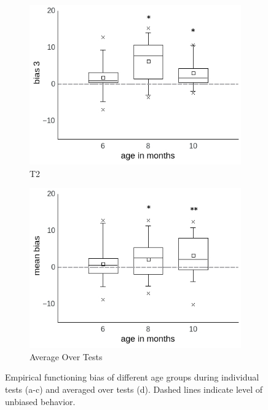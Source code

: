 \documentclass[a4paper]{scrreprt}
\begin{document}
\begin{figure}
    \begin{subfigure}[b]{0.49\textwidth}
        \includegraphics[width=\textwidth]{figs/sec3/age/age_diff3_dat.jpeg}
        \caption{T2}
    \end{subfigure}
    \begin{subfigure}[b]{0.49\textwidth}
        \includegraphics[width=\textwidth]{figs/sec3/age/age_diff_mean_dat.jpeg}
        \caption{Average Over Tests}
    \end{subfigure}
\caption{Empirical functioning bias of different age groups during individual tests (a-c) and averaged over tests (d). Dashed lines indicate level of unbiased behavior.}
\label{fig:age_diff_dat}
\end{figure}
\end{document}
